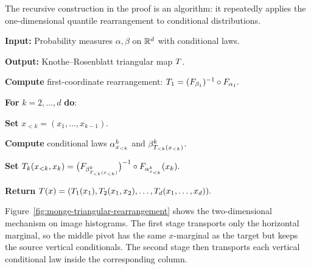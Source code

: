 The recursive construction in the proof is an algorithm: it repeatedly applies the one-dimensional quantile rearrangement to conditional distributions.

\begin{alg}\label{alg:triangular-rearrangement}
\textbf{Input:} Probability measures $\alpha,\beta$ on $\mathbb{R}^d$ with conditional laws.

\textbf{Output:} Knothe--Rosenblatt triangular map $T$.

\textbf{Compute} first-coordinate rearrangement:
\(T_1=(F_{\beta_1})^{-1}\circ F_{\alpha_1}.\)

\textbf{For} $k=2,\ldots,d$ \textbf{do}:
\begin{algblock}

\textbf{Set} $x_{<k}=(x_1,\ldots,x_{k-1})$.

\textbf{Compute} conditional laws $\alpha^k_{x_{<k}}$ and $\beta^k_{T_{<k}(x_{<k})}$.

\textbf{Set}
\(T_k(x_{<k},x_k) = \bigl(F_{\beta^k_{T_{<k}(x_{<k})}}\bigr)^{-1} \circ F_{\alpha^k_{x_{<k}}}(x_k).\)
\end{algblock}
\algreturnskip
\textbf{Return} \(T(x)=(T_1(x_1),T_2(x_1,x_2),\ldots,T_d(x_1,\ldots,x_d)).\)
\end{alg}

Figure~\ref{fig:monge-triangular-rearrangement} shows the two-dimensional mechanism on image histograms. The first stage transports only the horizontal marginal, so the middle pivot has the same $x$-marginal as the target but keeps the source vertical conditionals. The second stage then transports each vertical conditional law inside the corresponding column.

